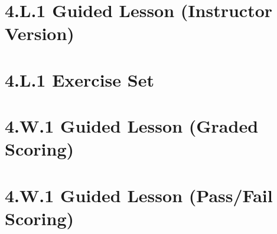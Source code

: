 \documentclass[a4paper,12pt]{article}
\begin{document}
\newpage
\section{4.L.1 Guided Lesson (Instructor Version)}


\newpage
\section{4.L.1 Exercise Set }


\newpage
\section{4.W.1 Guided Lesson (Graded Scoring)}




\newpage
\section{4.W.1 Guided Lesson (Pass/Fail Scoring)}

\end{document}
